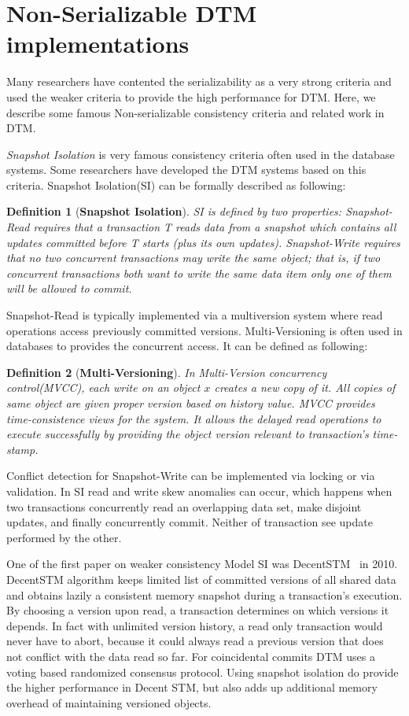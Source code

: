 \documentclass[12pt,english]{report}
\newtheorem{definition}{Definition}[section]
\begin{document}
\section{Non-Serializable DTM implementations}

Many researchers have contented the serializability as a very strong criteria and used the weaker criteria to provide the high performance for DTM. Here, we describe some famous Non-serializable consistency criteria and  related work in DTM. 

\textit{Snapshot Isolation} is very famous consistency criteria often used in the database systems. Some researchers have developed the DTM systems based on this criteria. Snapshot Isolation(SI) can be formally described as following:

\begin{definition}[\textbf{Snapshot Isolation}]
SI is defined by two properties: \textit{Snapshot-Read} requires that a transaction T reads data from a snapshot which contains all updates committed before T starts (plus its own updates). \textit{Snapshot-Write} requires that no two concurrent transactions may write the same object; that is, if two concurrent transactions both want to write the same data item only one of them will be allowed to commit.
\end{definition}

Snapshot-Read is typically implemented via a multiversion system where read operations access previously committed versions. Multi-Versioning is often used in databases to provides the concurrent access. It can be defined as following:
\begin{definition}[\textbf{Multi-Versioning}]
In Multi-Version concurrency control(MVCC), each write on an object $x$ creates a new copy of it. All copies of same object are given proper version based on history value. MVCC provides time-consistence views for the system. It allows the delayed read operations to execute successfully by providing the object version relevant to transaction's time-stamp. 
\end{definition}

Conflict detection for Snapshot-Write can be implemented via locking or via validation. In SI read and write skew anomalies can occur, which happens when two transactions concurrently read an overlapping data set, make disjoint updates, and finally concurrently commit. Neither of transaction see update performed by the other.

One of the first paper on weaker consistency Model SI was DecentSTM~\cite{DecentSTM:5470446} in 2010.  DecentSTM algorithm keeps limited list of committed versions of all shared data and obtains lazily a consistent memory snapshot during a transaction’s execution. By choosing a version upon read, a transaction determines on which versions it depends. In fact with unlimited version history, a read only transaction would never have to abort, because it could always read a previous version that does not conflict with the data read so far. For coincidental commits DTM uses a voting based randomized consensus protocol. Using snapshot isolation do provide the higher performance in Decent STM, but also adds up additional memory overhead of maintaining versioned objects.  
\end{document}
